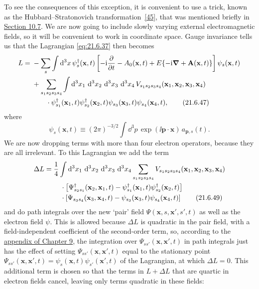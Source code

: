 To see the consequences of this exception, it is convenient to use a trick, known as the Hubbard--Stratonovich transformation~\hyperref[ch21-ref-45]{[45]}, that was mentioned briefly in \hyperref[sec:10.7]{Section 10.7}. We are now going to include slowly varying external electromagnetic fields, so it will be convenient to work in coordinate space. Gauge invariance tells us that the Lagrangian \eqref{eq:21.6.37} then becomes
\begin{align}
L={}&-\sum_s\int \mathop{}\!\mathrm{d}^3x\,
\psi_s^\dagger(\mathbf x,t)
\left[
-\mathrm{i}\frac{\partial}{\partial t}-A_0(\mathbf x,t)
+E\{-\mathrm{i}\boldsymbol\nabla+\mathbf A(\mathbf x,t)\}
\right]\psi_s(\mathbf x,t)
\notag\\
&+\sum_{s_1s_2s_3s_4}
\int \mathop{}\!\mathrm{d}^3x_1\,\mathop{}\!\mathrm{d}^3x_2\,\mathop{}\!\mathrm{d}^3x_3\,\mathop{}\!\mathrm{d}^3x_4\,
V_{s_1s_2s_3s_4}(\mathbf x_1,\mathbf x_2,\mathbf x_3,\mathbf x_4)
\notag\\
&\qquad\cdot
\psi^\dagger_{s_1}(\mathbf x_1,t)
\psi^\dagger_{s_2}(\mathbf x_2,t)
\psi_{s_3}(\mathbf x_3,t)
\psi_{s_4}(\mathbf x_4,t),
\tag{21.6.47}\label{eq:21.6.47}
\end{align}
where
\begin{equation}
\psi_s(\mathbf x,t)\equiv(2\pi)^{-3/2}
\int \dd^3p\,\exp(\ii\mathbf p\cdot\mathbf x)\,a_{\mathbf p,s}(t).
\tag{21.6.48}\label{eq:21.6.48}
\end{equation}
We are now dropping terms with more than four electron operators, because they are all irrelevant. To this Lagrangian we add the term
\begin{align}
\Delta L={}&\frac14
\int \mathop{}\!\mathrm{d}^3x_1\,\mathop{}\!\mathrm{d}^3x_2\,\mathop{}\!\mathrm{d}^3x_3\,\mathop{}\!\mathrm{d}^3x_4
\sum_{s_1s_2s_3s_4}
V_{s_1s_2s_3s_4}(\mathbf x_1,\mathbf x_2,\mathbf x_3,\mathbf x_4)
\notag\\
&\quad\cdot
\left[
\Psi^\dagger_{s_2s_1}(\mathbf x_2,\mathbf x_1,t)
-\psi^\dagger_{s_1}(\mathbf x_1,t)\psi^\dagger_{s_2}(\mathbf x_2,t)
\right]
\notag\\
&\quad\cdot
\left[
\Psi_{s_3s_4}(\mathbf x_3,\mathbf x_4,t)
-\psi_{s_3}(\mathbf x_3,t)\psi_{s_4}(\mathbf x_4,t)
\right]
\tag{21.6.49}\label{eq:21.6.49}
\end{align}
and do path integrals over the new `pair' field $\Psi(\mathbf x,s,\mathbf x',s',t)$ as well as the electron field $\psi$. This is allowed because $\Delta L$ is quadratic in the pair field, with a field-independent coefficient of the second-order term, so, according to the \hyperref[app:9]{appendix of Chapter 9}, the integration over $\Psi_{ss'}(\mathbf x,\mathbf x',t)$ in path integrals just has the effect of setting $\Psi_{ss'}(\mathbf x,\mathbf x',t)$ equal to the stationary point $\Psi_{ss'}(\mathbf x,\mathbf x',t)=\psi_s(\mathbf x,t)\psi_{s'}(\mathbf x',t)$ of the Lagrangian, at which $\Delta L=0$. This additional term is chosen so that the terms in $L+\Delta L$ that are quartic in electron fields cancel, leaving only terms quadratic in these fields:
